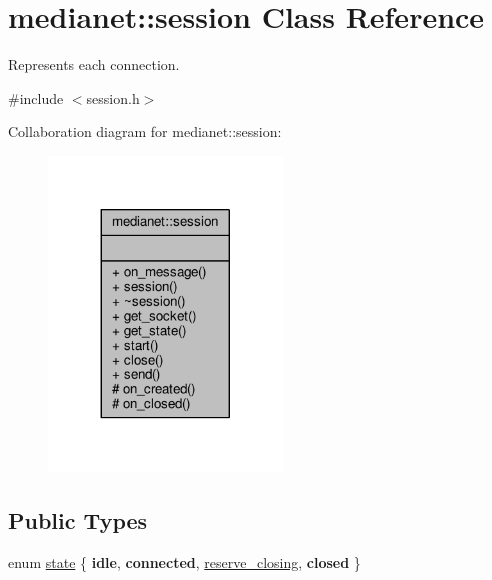 \hypertarget{classmedianet_1_1session}{}\section{medianet\+::session Class Reference}
\label{classmedianet_1_1session}


Represents each connection.  




{\ttfamily \#include $<$session.\+h$>$}



Collaboration diagram for medianet\+::session\+:
\nopagebreak
\begin{figure}[H]
\begin{center}
\leavevmode
\includegraphics[width=176pt]{classmedianet_1_1session__coll__graph}
\end{center}
\end{figure}
\subsection*{Public Types}
\begin{DoxyCompactItemize}
\item 
enum \mbox{\hyperlink{classmedianet_1_1session_a8ebb6f84fba5564ef87d553c6f823f1e}{state}} \{ {\bfseries idle}, 
{\bfseries connected}, 
\mbox{\hyperlink{classmedianet_1_1session_a8ebb6f84fba5564ef87d553c6f823f1ead5fee2f76eb10b1d5fe7951bf0b3c216}{reserve\+\_\+closing}}, 
{\bfseries closed}
 \}
\end{DoxyCompactItemize}
